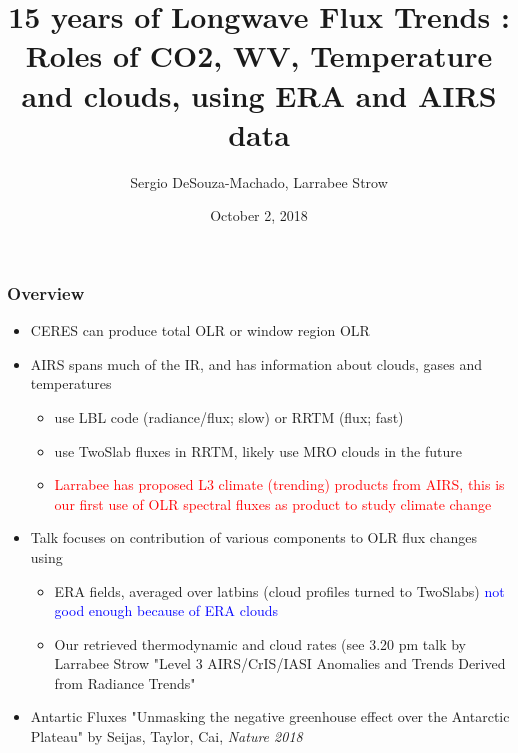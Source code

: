 \documentclass[10pt,t]{beamer}
\begin{document}
\title[]{15 years of Longwave Flux Trends : \newline
  Roles of CO2, WV, Temperature and clouds, \newline
  using ERA and AIRS data}
\author{Sergio DeSouza-Machado, Larrabee Strow}
\date{October 2, 2018}
\begin{frame}
  \titlepage
\end{frame}
\begin{frame}
  \frametitle{Overview}
  \begin{itemize}
  \item CERES can produce total OLR or window region OLR
  \item AIRS spans much of the IR, and has information about clouds, gases and temperatures
    \begin{itemize}    
    \item use LBL code (radiance/flux; slow) or RRTM (flux; fast)
    \item use TwoSlab fluxes in RRTM, likely use MRO clouds in the future
    \item \textcolor{red}{Larrabee has proposed L3 climate (trending) products from AIRS,
          this is our first use of OLR spectral fluxes as product to study climate change}
    \end{itemize}
  \item Talk focuses on contribution of various components to OLR flux changes using
    \begin{itemize}
    \item ERA fields, averaged over latbins (cloud profiles turned to TwoSlabs) \textcolor{blue}{not good enough because of ERA clouds}
    \item Our retrieved thermodynamic and cloud rates (see 3.20 pm talk by Larrabee Strow "Level 3
      AIRS/CrIS/IASI Anomalies and Trends Derived from Radiance Trends"
    \end{itemize}
  \item Antartic Fluxes "Unmasking the negative greenhouse effect over the Antarctic Plateau" by Seijas, Taylor, Cai, \emph{Nature 2018}    
  \end{itemize}
\end{frame}
\end{document}
